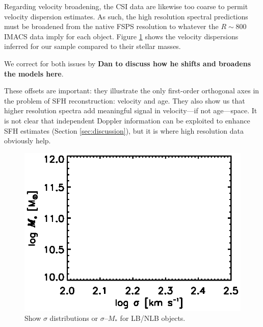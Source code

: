 \documentclass[a4paper,fleqn,usenatbib]{mnras}
\newcommand{\Mstel}{M_\ast}
\newcommand{\bfr}{\bf\color{red}}
\newcommand{\bfb}{\color{myblue}}
\begin{document}
Regarding velocity broadening, the CSI data are likewise too coarse to permit velocity
dispersion estimates. As such, the high resolution spectral predictions
must be broadened from the native FSPS resolution to whatever the $R\sim800$ IMACS 
data imply for each object. Figure \ref{fig:disp} shows the velocity dispersions
inferred for our sample compared to their stellar masses.

We correct for both issues by {\bfr Dan to discuss how he shifts and broadens the models here}.

These offsets are important: they illustrate the only first-order orthogonal axes in the problem of SFH 
reconstruction: velocity and age. They also show us that higher resolution spectra add meaningful 
signal in velocity---if not age---space. It is not clear that independent Doppler
information can be exploited to enhance SFH estimates (Section \ref{sec:discussion}), but it
is where high resolution data obviously help.

\begin{figure}
\centering
\includegraphics[scale = 0.9, trim = 1cm 0cm 0cm 0cm]{disp}
\caption{\bfb Show $\sigma$ distributions or $\sigma$--$\Mstel$ for LB/NLB objects.}
\label{fig:disp}
\end{figure}
\end{document}
